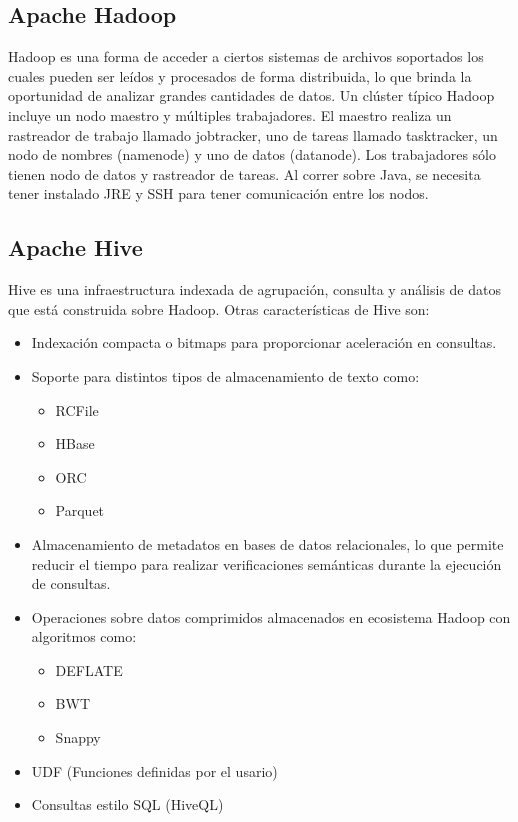 \subsection{Apache Hadoop}
Hadoop\cite{hadoop} es una forma de acceder a ciertos sistemas de archivos soportados los cuales  pueden ser leídos y procesados de forma distribuida, lo que brinda la oportunidad de analizar grandes cantidades de datos. Un clúster típico Hadoop incluye un nodo maestro y múltiples trabajadores. El maestro realiza un rastreador de trabajo llamado jobtracker, uno de tareas llamado tasktracker, un nodo de nombres (namenode) y uno de datos (datanode). Los trabajadores sólo tienen nodo de datos y rastreador de tareas. Al correr sobre Java, se necesita tener instalado JRE y SSH para tener comunicación entre los nodos.

\subsection{Apache Hive}
Hive es una infraestructura indexada de agrupación, consulta y análisis de datos que está construida sobre Hadoop. Otras características de Hive son:
\begin{itemize}
    \item Indexación compacta o bitmaps para proporcionar aceleración en consultas.
    \item Soporte para distintos tipos de almacenamiento de texto como:
        \begin{itemize}
            \item RCFile
            \item HBase
            \item ORC
            \item Parquet
        \end{itemize}
    \item Almacenamiento de metadatos en bases de datos relacionales, lo que permite reducir el tiempo para realizar verificaciones semánticas durante la ejecución de consultas.
    \item Operaciones sobre datos comprimidos almacenados en ecosistema Hadoop con algoritmos como:
        \begin{itemize}
            \item DEFLATE
            \item BWT
            \item Snappy
        \end{itemize}
    \item UDF (Funciones definidas por el usario)
    \item Consultas estilo SQL (HiveQL)
\end{itemize}


